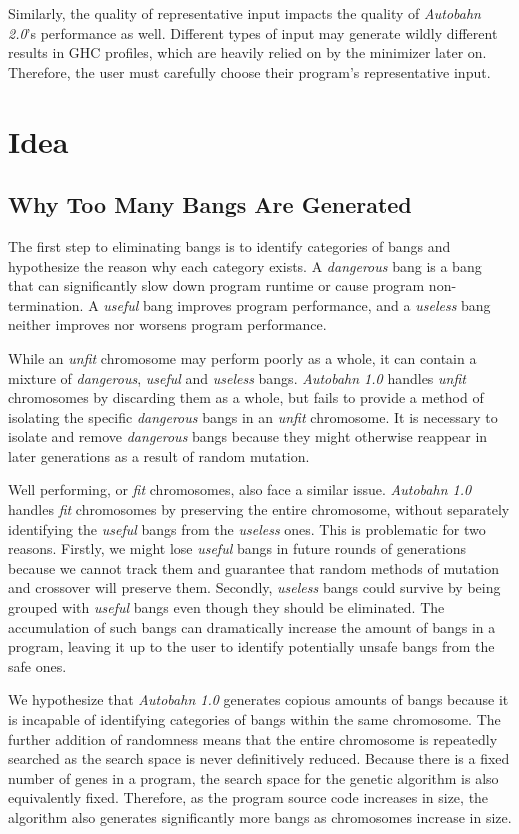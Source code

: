 \documentclass[format=sigplan]{acmart}
\newcommand{\unfit}[0]{\textit{unfit}}
\newcommand{\dangerous}[0]{\textit{dangerous}}
\newcommand{\useful}[0]{\textit{useful}}
\newcommand{\useless}[0]{\textit{useless}}
\newcommand{\Ao}[0]{\textit{Autobahn 1.0}}
\newcommand{\At}[0]{\textit{Autobahn 2.0}}
\newcommand{\fit}[0]{\textit{fit}}
\begin{document}
Similarly, the quality of representative input impacts the quality of \At{}'s performance as well. Different types of input may generate wildly different results in GHC profiles, which are heavily relied on by the minimizer later on. Therefore, the user must carefully choose their program's representative input.

\section{Idea}
\subsection{Why Too Many Bangs Are Generated}

The first step to eliminating bangs is to identify categories of bangs and hypothesize the reason why each category exists. A \dangerous{} bang is a bang that can significantly slow down program runtime or cause program non-termination. A \useful{} bang improves program performance, and a \useless{} bang neither improves nor worsens program performance. 

While an \unfit{} chromosome may perform poorly as a whole, it can contain a mixture of \dangerous, \useful{} and \useless{} bangs. \Ao{} handles \unfit{} chromosomes by discarding them as a whole, but fails to provide a method of isolating the specific \dangerous{} bangs in an \unfit{} chromosome. It is necessary to isolate and remove \dangerous{} bangs because they might otherwise reappear in later generations as a result of random mutation. 

Well performing, or \fit{} chromosomes, also face a similar issue. \Ao{} handles \fit{} chromosomes by preserving the entire chromosome, without separately identifying the \useful{} bangs from the \useless{} ones. This is problematic for two reasons. Firstly, we might lose \useful{} bangs in future rounds of generations because we cannot track them and guarantee that random methods of mutation and crossover will preserve them. Secondly, \useless{} bangs could survive by being grouped with \useful{} bangs even though they should be eliminated. The accumulation of such bangs can dramatically increase the amount of bangs in a program, leaving it up to the user to identify potentially unsafe bangs from the safe ones. 

We hypothesize that \Ao{} generates copious amounts of bangs because it is incapable of identifying categories of bangs within the same chromosome. The further addition of randomness means that the entire chromosome is repeatedly searched as the search space is never definitively reduced. Because there is a fixed number of genes in a program, the search space for the genetic algorithm is also equivalently fixed. Therefore, as the program source code increases in size, the algorithm also generates significantly more bangs as chromosomes increase in size. 
\end{document}
